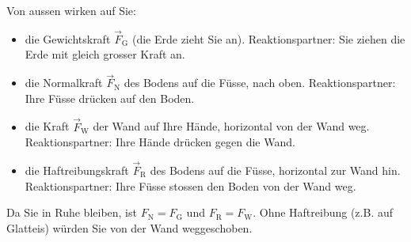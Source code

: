 \begin{center}
\end{center}

Von aussen wirken auf Sie:
\begin{itemize}
\item die Gewichtskraft $\vec F_\text{G}$ (die Erde zieht Sie an). Reaktionspartner: Sie ziehen die Erde mit gleich grosser Kraft an.
\item die Normalkraft $\vec F_\text{N}$ des Bodens auf die Füsse, nach oben. Reaktionspartner: Ihre Füsse drücken auf den Boden.
\item die Kraft $\vec F_\text{W}$ der Wand auf Ihre Hände, horizontal von der Wand weg. Reaktionspartner: Ihre Hände drücken gegen die Wand.
\item die Haftreibungskraft $\vec F_\text{R}$ des Bodens auf die Füsse, horizontal zur Wand hin. Reaktionspartner: Ihre Füsse stossen den Boden von der Wand weg.
\end{itemize}
Da Sie in Ruhe bleiben, ist $F_\text{N} = F_\text{G}$ und $F_\text{R} = F_\text{W}$. Ohne Haftreibung (z.B. auf Glatteis) würden Sie von der Wand weggeschoben.
